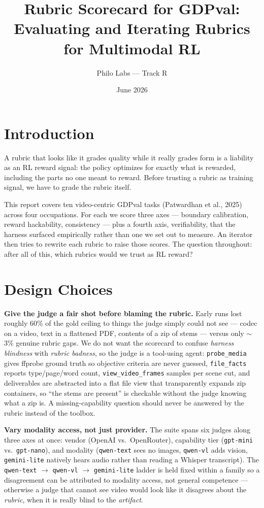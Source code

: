 \documentclass[11pt,a4paper]{article}
\title{Rubric Scorecard for GDPval:\\Evaluating and Iterating Rubrics for Multimodal RL}
\author{Philo Labs --- Track R}
\date{June 2026}
\begin{document}
\maketitle

\section{Introduction}

A rubric that looks like it grades quality while it really grades form is a liability as an RL reward signal: the policy optimizes for exactly what is rewarded, including the parts no one meant to reward. Before trusting a rubric as training signal, we have to grade the rubric itself.

This report covers ten video-centric GDPval tasks (Patwardhan et al., 2025) across four occupations. For each we score three axes --- boundary calibration, reward hackability, consistency --- plus a fourth axis, verifiability, that the harness surfaced empirically rather than one we set out to measure. An iterator then tries to rewrite each rubric to raise those scores. The question throughout: after all of this, which rubrics would we trust as RL reward?

\section{Design Choices}

\textbf{Give the judge a fair shot before blaming the rubric.} Early runs lost roughly 60\% of the gold ceiling to things the judge simply could not see --- codec on a video, text in a flattened PDF, contents of a zip of stems --- versus only $\sim$3\% genuine rubric gaps. We do not want the scorecard to confuse \emph{harness blindness} with \emph{rubric badness}, so the judge is a tool-using agent: \texttt{probe\_media} gives ffprobe ground truth so objective criteria are never guessed, \texttt{file\_facts} reports type/page/word count, \texttt{view\_video\_frames} samples per scene cut, and deliverables are abstracted into a flat file view that transparently expands zip containers, so ``the stems are present'' is checkable without the judge knowing what a zip is. A missing-capability question should never be answered by the rubric instead of the toolbox.

\textbf{Vary modality access, not just provider.} The suite spans six judges along three axes at once: vendor (OpenAI vs.\ OpenRouter), capability tier (\texttt{gpt-mini} vs.\ \texttt{gpt-nano}), and modality (\texttt{qwen-text} sees no images, \texttt{qwen-vl} adds vision, \texttt{gemini-lite} natively hears audio rather than reading a Whisper transcript). The \texttt{qwen-text} $\to$ \texttt{qwen-vl} $\to$ \texttt{gemini-lite} ladder is held fixed within a family so a disagreement can be attributed to modality access, not general competence --- otherwise a judge that cannot see video would look like it disagrees about the \emph{rubric}, when it is really blind to the \emph{artifact}.
\end{document}
